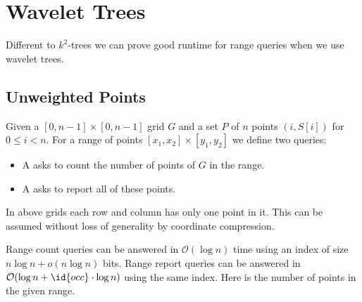 \section{Wavelet Trees}

Different to $k^2$-trees we can prove good runtime for range queries when we use wavelet trees.

\subsection{Unweighted Points}

\begin{Definition}
  Given a $[0, n-1] \times [0, n-1]$ grid $G$ and a set $P$ of $n$ points $(i, S[i])$ for $0 \leq i < n$. For a range of points $[x_1, x_2] \times [y_1, y_2]$ we define two queries:
  \begin{itemize}
    \item A  asks to count the number of points of $G$ in the range.
    \item A  asks to report all of these points.
  \end{itemize}
\end{Definition}

In above grids each row and column has only one point in it. This can be assumed without loss of generality by coordinate compression.

\begin{Theorem}
  Range count queries can be answered in $\mathcal{O}(\log n)$ time using an index of size $n \log n + o(n \log n)$ bits. Range report queries can be answered in $\mathcal{O}(\log n + \id{occ}\cdot\log n)$ using the same index. Here  is the number of points in the given range.
\end{Theorem}


